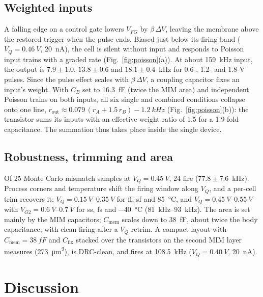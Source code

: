 \documentclass[pdflatex,sn-mathphys-num,iicol]{sn-jnl}
\begin{document}
\subsection{Weighted inputs}
A falling edge on a control gate lowers $V_{FG}$ by $\beta\,\Delta V$, leaving the membrane above the restored trigger when the pulse ends. Biased just below its firing band ($V_Q=\SI{0.46}{V}$, \SI{20}{nA}), the cell is silent without input and responds to Poisson input trains with a graded rate (Fig.~\ref{fig:poisson}(a)). At about \SI{159}{kHz} input, the output is $7.9\pm1.0$, $13.8\pm0.6$ and $18.1\pm0.4$~kHz for 0.6-, 1.2- and 1.8-V pulses. Since the pulse effect scales with $\beta\,\Delta V$, a coupling capacitor fixes an input's weight. With $C_B$ set to \SI{16.3}{fF} (twice the MIM area) and independent Poisson trains on both inputs, all six single and combined conditions collapse onto one line, $r_{\mathrm{out}}\approx0.079\,(r_A+1.5\,r_B)-\SI{1.2}{kHz}$ (Fig.~\ref{fig:poisson}(b)): the transistor sums its inputs with an effective weight ratio of 1.5 for a 1.9-fold capacitance. The summation thus takes place inside the single device.

\subsection{Robustness, trimming and area}
Of 25 Monte Carlo mismatch samples at $V_Q=\SI{0.45}{V}$, 24 fire ($77.8\pm7.6$~kHz). Process corners and temperature shift the firing window along $V_Q$, and a per-cell trim recovers it: $V_Q=\SIrange{0.15}{0.35}{V}$ for ff, sf and \SI{85}{\celsius}, and $V_Q=\SIrange{0.45}{0.55}{V}$ with $V_{G2}=\SIrange{0.6}{0.7}{V}$ for ss, fs and \SI{-40}{\celsius} (\SIrange{81}{93}{kHz}). The area is set mainly by the MIM capacitors; $C_{\mathrm{mem}}$ scales down to \SI{38}{fF}, about twice the body capacitance, with clean firing after a $V_Q$ retrim. A compact layout with $C_{\mathrm{mem}}=\SI{38}{fF}$ and $C_{\mathrm{fix}}$ stacked over the transistors on the second MIM layer measures  (\SI{273}{\micro\meter^2}), is DRC-clean, and fires at \SI{108.5}{kHz} ($V_Q=\SI{0.40}{V}$, \SI{20}{nA}).

\section{Discussion}\label{sec:discussion}
\end{document}

